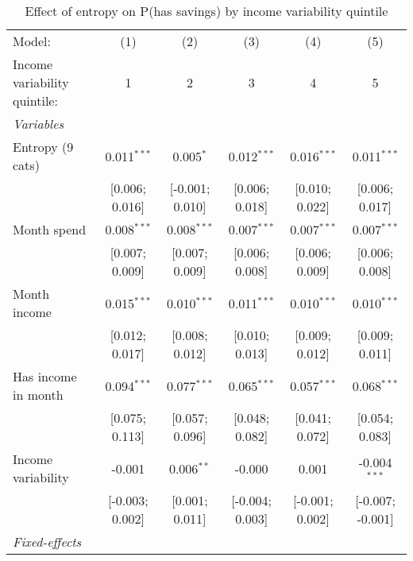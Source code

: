 
\begin{table}[htbp]
   \centering
   \tiny
   \begin{threeparttable}[b]
      \caption{\label{tab:reg_has_inflows_entropy_tag_z_inc_var_quint} Effect of entropy on P(has savings) by income variability quintile}
      \begin{tabular}{lccccc}
         \tabularnewline \midrule \midrule
         Model:                       & (1)             & (2)             & (3)             & (4)             & (5)\\  
         Income variability quintile: & 1               & 2               & 3               & 4               & 5 \\   
         \midrule
         \emph{Variables}\\
         Entropy (9 cats)             & 0.011$^{***}$   & 0.005$^{*}$     & 0.012$^{***}$   & 0.016$^{***}$   & 0.011$^{***}$\\   
                                      & [0.006; 0.016]  & [-0.001; 0.010] & [0.006; 0.018]  & [0.010; 0.022]  & [0.006; 0.017]\\   
         Month spend                  & 0.008$^{***}$   & 0.008$^{***}$   & 0.007$^{***}$   & 0.007$^{***}$   & 0.007$^{***}$\\   
                                      & [0.007; 0.009]  & [0.007; 0.009]  & [0.006; 0.008]  & [0.006; 0.009]  & [0.006; 0.008]\\   
         Month income                 & 0.015$^{***}$   & 0.010$^{***}$   & 0.011$^{***}$   & 0.010$^{***}$   & 0.010$^{***}$\\   
                                      & [0.012; 0.017]  & [0.008; 0.012]  & [0.010; 0.013]  & [0.009; 0.012]  & [0.009; 0.011]\\   
         Has income in month          & 0.094$^{***}$   & 0.077$^{***}$   & 0.065$^{***}$   & 0.057$^{***}$   & 0.068$^{***}$\\   
                                      & [0.075; 0.113]  & [0.057; 0.096]  & [0.048; 0.082]  & [0.041; 0.072]  & [0.054; 0.083]\\   
         Income variability           & -0.001          & 0.006$^{**}$    & -0.000          & 0.001           & -0.004$^{***}$\\   
                                      & [-0.003; 0.002] & [0.001; 0.011]  & [-0.004; 0.003] & [-0.001; 0.002] & [-0.007; -0.001]\\   
         \midrule
         \emph{Fixed-effects}\\

\end{tabular}
\end{threeparttable}
\end{table}
